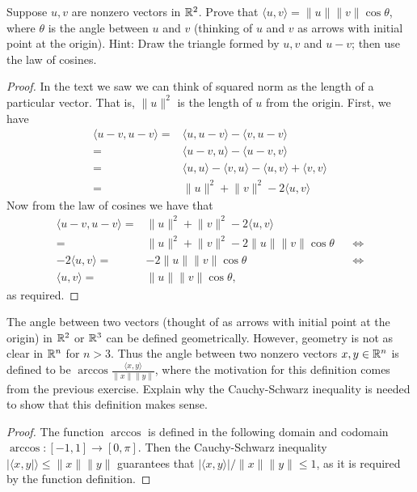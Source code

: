 \begin{exercise}{13}
  Suppose $u,v$ are nonzero vectors in $\mathbb{R}^2$. Prove that $\langle u,v\rangle= \lVert u\rVert\lVert v\rVert\cos\theta$, where $\theta$ is the angle between $u$ and $v$ (thinking of $u$ and $v$ as arrows with initial point at the origin). Hint: Draw the triangle formed by $u,v$ and $u-v$; then use the law of cosines.
\end{exercise}
\begin{proof}
 In the text we saw we can think of squared norm as the length of a particular vector. That is, $\lVert u\rVert^2$ is the length of $u$ from the origin. First, we have
 \begin{align*}
     \langle u-v, u-v\rangle =& \langle u, u-v\rangle-\langle v,u-v\rangle\\
     =& \langle u-v,u\rangle-\langle u-v,v\rangle\\
     =& \langle u,u\rangle-\langle v,u\rangle-\langle u,v\rangle +\langle v,v\rangle\\
     =& \lVert u\rVert^2+\lVert v\rVert^2-2\langle u,v\rangle
 \end{align*}
 Now from the law of cosines we have that
 \begin{align*}
     \langle u-v,u-v\rangle =& \lVert u\rVert^2+\lVert v\rVert^2-2\langle u,v\rangle\\
     =& \lVert u\rVert^2 +\lVert v\rVert^2 -2\lVert u\rVert\lVert v\rVert\cos\theta &&\iff\\
     -2\langle u,v\rangle =& -2\lVert u\rVert\lVert v\rVert\cos\theta &&\iff\\
     \langle u,v\rangle =& \lVert u\rVert\lVert v\rVert\cos\theta,
 \end{align*}
 as required.
\end{proof}

\begin{exercise}{14}
  The angle between two vectors (thought of as arrows with initial point at the origin) in $\mathbb{R}^2$ or $\mathbb{R}^3$ can be defined geometrically. However, geometry is not as clear in $\mathbb{R}^n$ for $n>3$. Thus the angle between two nonzero vectors $x,y\in\mathbb{R}^n$ is defined to be $\arccos\frac{\langle x,y\rangle}{\lVert x\rVert\lVert y\rVert}$, where the motivation for this definition comes from the previous exercise. Explain why the Cauchy-Schwarz inequality is needed to show that this definition makes sense.
\end{exercise}
\begin{proof}
 The function $\arccos$ is defined in the following domain and codomain $\arccos:[-1,1]\to[0,\pi]$. Then the Cauchy-Schwarz inequality $\lvert\langle x, y\rvert\rangle\leq\lVert x\rVert\lVert y\rVert$ guarantees that $\lvert \langle x,y\rangle\rvert/\lVert x\rVert\lVert y\rVert\leq 1$, as it is required by the function definition.
\end{proof}

